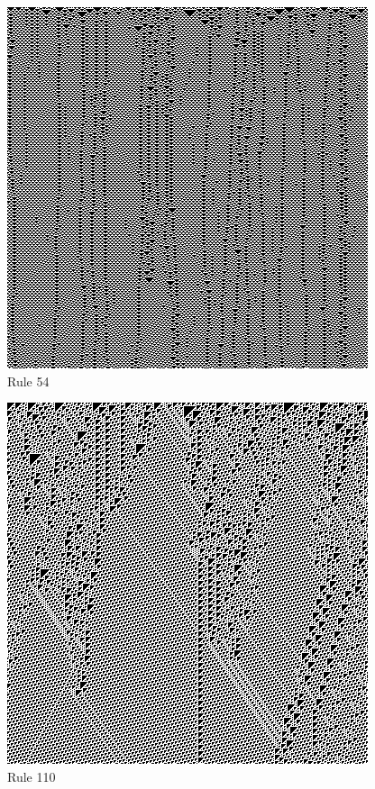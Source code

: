 \documentclass{article}
\begin{document}
\begin{figure}[H]
	\caption{Rule 54}
	\label{fig:figure1}
	\centering
	\includegraphics[scale=.75]{54.png}
\end{figure}
\begin{figure}[H]
	\caption{Rule 110}
	\label{fig:figure2}
	\centering
	\includegraphics[scale=.75]{110.png}
\end{figure}
\end{document}
